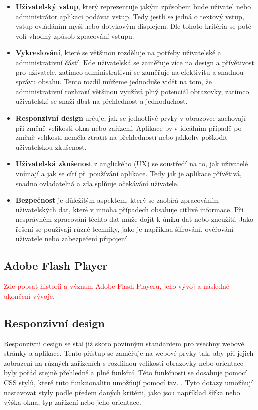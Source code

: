 \begin{itemize}
    \item \textbf{Uživatelský vstup}, který reprezentuje jakým způsobem bude uživatel nebo administrátor aplikaci podávat vstup. Tedy jestli se jedná o textový vstup, vstup ovládáním myši nebo dotykovým displejem. Dle tohoto kritéria se poté volí vhodný způsob zpracování vstupu.
    \item \textbf{Vykreslování}, které se většinou rozděluje na potřeby uživatelské a administrativní částí. Kde uživatelská se zaměřuje více na design a přívětivost pro uživatele, zatímco administrativní se zaměřuje na efektivitu a snadnou správu obsahu. Tento rozdíl můžeme jednoduše vidět na tom, že administrativní rozhraní většinou využívá plný potenciál obrazovky, zatímco uživatelské se snaží dbát na přehlednost a jednoduchost.
    \item \textbf{Responzivní design} určuje, jak se jednotlivé prvky v obrazovce zachovají při změně velikosti okna nebo zařízení. Aplikace by v ideálním případě po změně velikosti neměla ztratit na přehlednosti nebo jakkoliv poškodit uživatelskou zkušenost.
    \item \textbf{Uživatelská zkušenost} z anglického \textit{} (UX) se soustředí na to, jak uživatelé vnímají a jak se cítí při používání aplikace. Tedy jak je aplikace přívětivá, snadno ovladatelná a zda splňuje očekávání uživatele.
    \item \textbf{Bezpečnost} je důležitým aspektem, který se zaobírá zpracováním uživatelských dat, které v mnoha případech obsahuje citlivé informace. Při nesprávném zpracování těchto dat může dojít k úniku dat nebo zneužití. Jako řešení se používají různé techniky, jako je například šifrování, ověřování uživatele nebo zabezpečení připojení.
\end{itemize}

\subsection{Adobe Flash Player}
\label{subsec:ui-gui-theory-adobe-flash-player}
\textcolor{red}{Zde popsat historii a význam Adobe Flash Playeru, jeho vývoj a následné ukončení vývoje.}

\subsection{Responzivní design}
\label{subsec:ui-gui-theory-responsive-design}
Responzivní design se stal již skoro povinným standardem pro všechny webové stránky a aplikace. Tento přístup se zaměřuje na webové prvky tak, aby při jejich zobrazení na různých zařízeních s rozdílnou velikosti obrazovky nebo orientace byly pořád stejně přehledné a plně funkční. Této funkčnosti se dosahuje pomocí CSS stylů, které tuto funkcionalitu umožňují pomocí tzv. \textit{}. Tyto dotazy umožňují nastavovat styly podle předem daných kritérii, jako jsou například šířka nebo výška okna, typ zařízení nebo jeho orientace.

